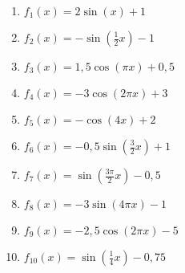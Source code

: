 \documentclass[a4paper,12pt, headsepline, ngerman]{scrartcl}
\theoremstyle{definition}
\newcommand{\fakesubsection}[1]{%
	\par\refstepcounter{subsection}%
	\subsectionmark{#1}%
	\addcontentsline{toc}{subsection}{\protect\numberline{\thesubsection}#1}%
}
\begin{document}
\begin{Answer}[ref=allgSinCosA2]
\begin{enumerate}[label=\alph*)]
	\item \(f_1(x)=2\sin\left(x\right)+1\)
	\item \(f_2(x)=-\sin\left(\frac{1}{2}x\right)-1\)
	\item \(f_3(x)=1,5\cos\left(\pi x\right)+0,5\)
	\item \(f_4(x)=-3\cos\left(2\pi x\right)+3\)
	\item \(f_5(x)=-\cos\left(4x\right)+2\)
	\item \(f_6(x)=-0,5\sin\left(\frac{3}{2}x\right)+1\)
	\item \(f_7(x)=\sin\left(\frac{3\pi}{2}x\right)-0,5\)
	\item \(f_8(x)=-3\sin\left(4\pi x\right)-1\)
	\item \(f_9(x)=-2,5\cos\left(2\pi x\right)-5\)
	\item \(f_{10}(x)=\sin\left(\frac{1}{4} x\right)-0,75\)
\end{enumerate}
\end{Answer}

\end{document}
